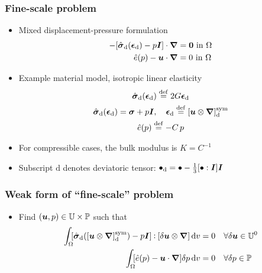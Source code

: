 \documentclass[11pt]{beamer} %
\renewcommand{\dev}{\mathrm{d}}
\newcommand{\external}{\mathrm{ext}}
\newcommand{\surf}{\mathrm{s}}
\newcommand{\pore}{\mathrm{pore}}
\begin{document}
\begin{frame}
 \frametitle{Fine-scale problem}
 \begin{itemize}
  \item Mixed displacement-pressure formulation
  \begin{align*}
   -[\hat{\ts\sigma}_\dev(\ts\epsilon_\dev) - p\ts I]\cdot\ta\nabla &= \ta 0 \text{ in } \Omega
    \\
    \hat{e}(p) - \ta u\cdot\ta\nabla &= 0\text{ in } \Omega%
  \end{align*}
  \item Example material model, isotropic linear elasticity
  \begin{gather*}
   \hat{\ts\sigma}_\dev(\ts\epsilon_\dev) \defeq 2 G \ts\epsilon_\dev\\
   \hat{\ts\sigma}_\dev(\ts\epsilon_\dev) = \ts\sigma + p\ts I,\quad \ts\epsilon_\dev \defeq [\ta u\outerp \diff]_\dev^\sym
   \\
   \hat{e}(p) \defeq -C\,p
  \end{gather*}
  \item For compressible cases, the bulk modulus is $ K = C^{-1}$
  \item Subscript $\dev$ denotes deviatoric tensor: $\bullet_\dev = \bullet - \frac13 [\bullet:\ts I]\ts I$
 \end{itemize}
\end{frame}

\begin{frame}
 \frametitle{Weak form of ``fine-scale'' problem}
 \begin{itemize}
  \item %
Find $(\boldsymbol{u},p)\in \mathbb{U} \times \mathbb{P}$ such that
\begin{align*}
  \int_{\mathrlap{\Omega}} \;[\hat{\ts\sigma}_\dev([\ta u\outerp\diff]_\dev^\sym)-p\ts I]\dprod[\delta\ta u\outerp\ta\nabla]\dif v &=
   0 %
    && \forall \delta \ta u\in \set U^0
\\
  \int_{\mathrlap{\Omega}} \;[\hat{e}(p) - \ta u\cdot\ta\nabla]\delta p \dif v &= 0 && \forall \delta p\in \set P
\end{align*}
 \end{itemize}
\end{frame}
\end{document}
